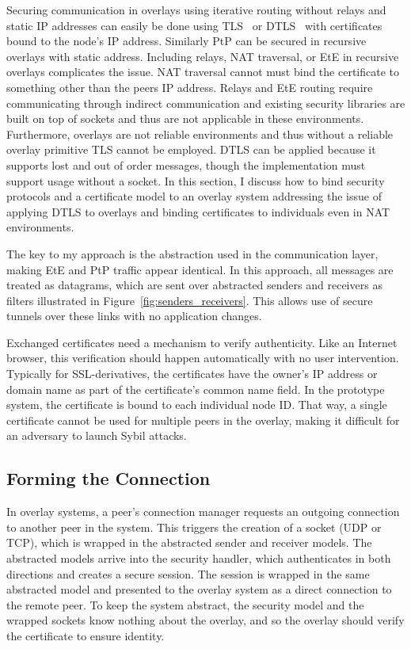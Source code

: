 Securing communication in overlays using iterative routing without relays and
static IP addresses can easily be done using TLS~\cite{tls} or DTLS~\cite{dtls}
with certificates bound to the node's IP address.  Similarly PtP can be secured
in recursive overlays with static address.  Including relays, NAT traversal, or
EtE in recursive overlays complicates the issue.  NAT traversal cannot must
bind the certificate to something other than the peers IP address. Relays and
EtE routing require communicating through indirect communication and existing
security libraries are built on top of sockets and thus are not applicable in
these environments.  Furthermore, overlays are not reliable environments and
thus without a reliable overlay primitive TLS cannot be employed.  DTLS can
be applied because it supports lost and out of order messages, though the
implementation must support usage without a socket.  In this section, I discuss
how to bind security protocols and a certificate model to an overlay system
addressing the issue of applying DTLS to overlays and binding certificates to
individuals even in NAT environments.

The key to my approach is the abstraction used in the communication layer,
making EtE and PtP traffic appear identical. In this approach, all messages
are treated as datagrams, which are sent over abstracted senders and receivers
as filters illustrated in Figure~\ref{fig:senders_receivers}.  This allows use
of secure tunnels over these links with no application changes.

Exchanged certificates need a mechanism to verify authenticity.  Like an
Internet browser, this verification should happen automatically with no user
intervention.  Typically for SSL-derivatives, the certificates have the owner's
IP address or domain name as part of the certificate's common name field.  In
the prototype system, the certificate is bound to each individual node ID.
That way, a single certificate cannot be used for multiple peers in the
overlay, making it difficult for an adversary to launch Sybil attacks.

\subsection{Forming the Connection}
In overlay systems, a peer's connection manager requests an outgoing
connection to another peer in the system.  This triggers the creation of a
socket (UDP or TCP), which is wrapped in the abstracted sender and receiver
models.  The abstracted models arrive into the security handler, which
authenticates in both directions and creates a secure session.  The session is
wrapped in the same abstracted model and presented to the overlay system as a
direct connection to the remote peer.  To keep the system abstract, the security
model and the wrapped sockets know nothing about the overlay, and so the overlay
should verify the certificate to ensure identity.

